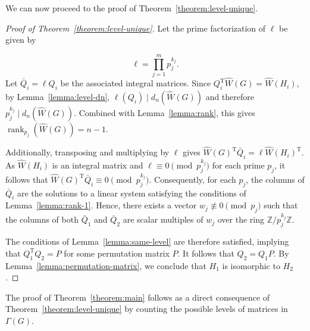 \documentclass[12pt]{article}
\theoremstyle{plain}
\theoremstyle{definition}
\newcommand{\trans}{^{\mathrm{T}}}
\begin{document}
We can now proceed to the proof of Theorem~\ref{theorem:level-unique}.

\begin{proof}[Proof of Theorem~\ref{theorem:level-unique}]
Let the prime factorization of $\ell$ be given by

$$\ell = \prod_{j=1}^m p_j^{k_j}.$$
Let $\bar{Q}_i = \ell Q_i$ be the associated integral matrices. Since $Q_i\trans \hat{W}(G) = \hat{W}(H_i)$, by Lemma~\ref{lemma:level-dn}, $\ell(Q_i) \mid d_n(\hat{W}(G))$ and therefore $p_j^{k_j} \mid d_n(\hat{W}(G))$. Combined with Lemma~\ref{lemma:rank}, this gives $\operatorname{rank}_{p_j}(\hat{W}(G))=n-1$.

Additionally, transposing and multiplying by $\ell$ gives $\hat{W}(G)\trans \bar{Q}_i = \ell \hat{W}(H_i)\trans$. As $\hat{W}(H_i)$ is an integral matrix and $\ell\equiv0\pmod{p_j^{k_j}}$ for each prime $p_j$, it follows that $\hat{W}(G)\trans \bar{Q}_i \equiv 0 \pmod{p_j^{k_j}}.$ Consequently, for each $p_j$, the columns of $\bar{Q}_i$ are the solutions to a linear system satisfying the conditions of Lemma~\ref{lemma:rank-1}. Hence, there exists a vector $w_j \not\equiv 0 \pmod{p_j}$ such that the columns of both $\bar{Q}_1$ and $\bar{Q}_2$ are scalar multiples of $w_j$ over the ring $\mathbb{Z}/p_j^{k_j}\mathbb{Z}$.

The conditions of Lemma~\ref{lemma:same-level} are therefore satisfied, implying that $Q_1\trans Q_2 = P$ for some permutation matrix $P$. It follows that $Q_2 = Q_1 P$. By Lemma~\ref{lemma:permutation-matrix}, we conclude that $H_1$ is isomorphic to $H_2$.
\end{proof}

The proof of Theorem~\ref{theorem:main} follows as a direct consequence of Theorem~\ref{theorem:level-unique} by counting the possible levels of matrices in $\Gamma(G)$.
\end{document}

